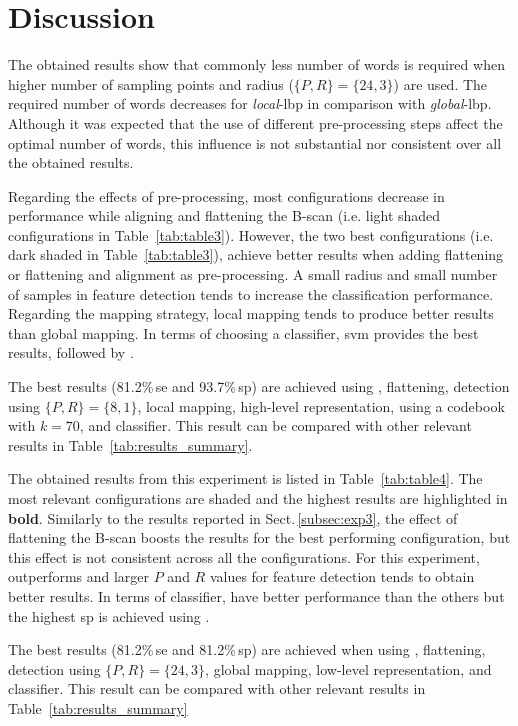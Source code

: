 \section{Discussion}
\label{sec:dis}

The obtained results show that commonly less number of words is required when higher number of sampling points and radius ($\{P,R\} = \{24,3\}$) are used.
The required number of words decreases for \emph{local}-\ac{lbp} in comparison with \emph{global}-\ac{lbp}.
Although it was expected that the use of different pre-processing steps affect the optimal number of words, this influence is not substantial nor consistent over all the obtained results.


Regarding the effects of pre-processing, most configurations decrease in performance while aligning and flattening the B-scan (i.e. light shaded configurations in Table~\ref{tab:table3}).
However, the two best configurations (i.e. dark shaded in Table~\ref{tab:table3}), achieve better results when adding flattening or flattening and alignment as pre-processing.
A small radius and small number of samples in feature detection tends to increase the classification performance.
Regarding the mapping strategy, local mapping tends to produce better results than global mapping.
In terms of choosing a classifier, \ac{svm} provides the best results, followed by \rf.

The best results (81.2\%\,\ac{se} and 93.7\%\,\ac{sp}) are achieved using \nlm, flattening, \lbp detection using $\{P,R\} = \{8,1\}$, local mapping, high-level representation, using a codebook with $k=70$, and \svm classifier.
This result can be compared with other relevant results in Table~\ref{tab:results_summary}.



The obtained results from this experiment is listed in Table~\ref{tab:table4}.
The most relevant configurations are shaded and the highest results are highlighted in \textbf{bold}.
Similarly to the results reported in Sect.\,\ref{subsec:exp3}, the effect of flattening the B-scan boosts the results for the best performing configuration, but this effect is not consistent across all the configurations.
For this experiment, \lbptop outperforms \lbp and larger $P$ and $R$ values for feature detection tends to obtain better results. 
In terms of classifier, \rf have better performance than the others but the highest \ac{sp} is achieved using \svm.


The best results (81.2\%\,\ac{se} and 81.2\%\,\ac{sp}) are achieved when using \nlm, flattening, \lbptop detection using $\{P,R\}= \{24,3\}$, global mapping, low-level representation, and \rf classifier.
This result can be compared with other relevant results in Table~\ref{tab:results_summary}